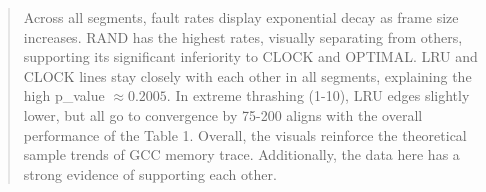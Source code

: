 \documentclass[a4paper, 11pt]{report}
\begin{document}
    \begin{flushright}
        \vspace{0.5cm}
        \begin{minipage}[t]{0.5\linewidth}
            \begin{quote}
                Across all segments, fault rates display exponential decay as frame size increases. RAND has the highest rates, 
                visually separating from others, supporting its significant inferiority to CLOCK and OPTIMAL. LRU and CLOCK lines stay closely with each other in all 
                segments, explaining the high p\_value $\approx 0.2005$. In extreme thrashing (1-10), LRU edges slightly lower, but all go to convergence by 75-200 
                aligns with the overall performance of the Table 1. Overall, the visuals reinforce the theoretical sample trends of GCC memory trace.
                Additionally, the data here has a strong evidence of supporting each other.
            \end{quote}
        \end{minipage}
    \end{flushright}
    \begin{figure}[H]
        
    \end{figure}

\newpage
\end{document}
